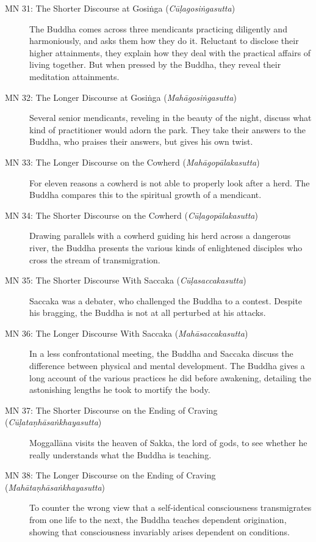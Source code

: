 \documentclass[12pt,openany]{book}%
\begin{document}
\begin{description}
\item[MN 31: The Shorter Discourse at \textsanskrit{Gosiṅga} (\textit{\textsanskrit{Cūḷagosiṅgasutta}})] The Buddha comes across three mendicants practicing diligently and harmoniously, and asks them how they do it. Reluctant to disclose their higher attainments, they explain how they deal with the practical affairs of living together. But when pressed by the Buddha, they reveal their meditation attainments.%
\item[MN 32: The Longer Discourse at \textsanskrit{Gosiṅga} (\textit{\textsanskrit{Mahāgosiṅgasutta}})] Several senior mendicants, reveling in the beauty of the night, discuss what kind of practitioner would adorn the park. They take their answers to the Buddha, who praises their answers, but gives his own twist.%
\item[MN 33: The Longer Discourse on the Cowherd (\textit{\textsanskrit{Mahāgopālakasutta}})] For eleven reasons a cowherd is not able to properly look after a herd. The Buddha compares this to the spiritual growth of a mendicant.%
\item[MN 34: The Shorter Discourse on the Cowherd (\textit{\textsanskrit{Cūḷagopālakasutta}})] Drawing parallels with a cowherd guiding his herd across a dangerous river, the Buddha presents the various kinds of enlightened disciples who cross the stream of transmigration.%
\item[MN 35: The Shorter Discourse With Saccaka (\textit{\textsanskrit{Cūḷasaccakasutta}})] Saccaka was a debater, who challenged the Buddha to a contest. Despite his bragging, the Buddha is not at all perturbed at his attacks.%
\item[MN 36: The Longer Discourse With Saccaka (\textit{\textsanskrit{Mahāsaccakasutta}})] In a less confrontational meeting, the Buddha and Saccaka discuss the difference between physical and mental development. The Buddha gives a long account of the various practices he did before awakening, detailing the astonishing lengths he took to mortify the body.%
\item[MN 37: The Shorter Discourse on the Ending of Craving (\textit{\textsanskrit{Cūḷataṇhāsaṅkhayasutta}})] \textsanskrit{Moggallāna} visits the heaven of Sakka, the lord of gods, to see whether he really understands what the Buddha is teaching.%
\item[MN 38: The Longer Discourse on the Ending of Craving (\textit{\textsanskrit{Mahātaṇhāsaṅkhayasutta}})] To counter the wrong view that a self-identical consciousness transmigrates from one life to the next, the Buddha teaches dependent origination, showing that consciousness invariably arises dependent on conditions.%

\end{description}
\end{document}
